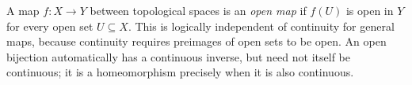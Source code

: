 
A map $f:X\to Y$ between topological spaces is an \emph{open map} if $f(U)$ is open in $Y$ for every open set $U\subseteq X$. This is logically independent of continuity for general maps, because continuity requires preimages of open sets to be open. An open bijection automatically has a continuous inverse, but need not itself be continuous; it is a homeomorphism precisely when it is also continuous.
